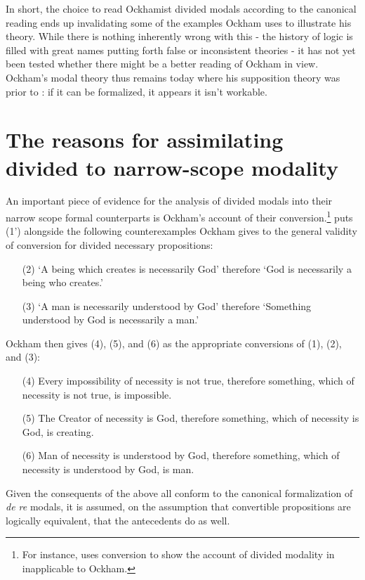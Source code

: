 \documentclass[a4paper]{article}
\begin{document}
In short, the choice to read Ockhamist divided modals according to the canonical reading ends up invalidating some of the examples Ockham uses to illustrate his theory. While there is nothing inherently wrong with this - the history of logic is filled with great names putting forth false or inconsistent theories - it has not yet been tested whether there might be a better reading of Ockham in view. Ockham's modal theory thus remains today where his supposition theory was prior to \cite{PriestRead1977}: if it can be formalized, it appears it isn't workable.

\section{The reasons for assimilating divided to narrow-scope modality}
An important piece of evidence for the analysis of divided modals into their narrow scope formal counterparts is Ockham's account of their conversion.\footnote{For instance, \cite[p. 276]{PriestRead1981} uses conversion to show the account of divided modality in \cite[sec. 12]{Moody1952} inapplicable to Ockham.} \cite[p. 242]{Johnston2015} puts (1') alongside the following counterexamples Ockham gives to the general validity of conversion for divided necessary propositions:
\begin{enumerate}
	\item[(2)]	`A being which creates is necessarily God' therefore `God is necessarily a being who creates.' 
	\item[(3)]	`A man is necessarily understood by God' therefore `Something understood by God is necessarily a man.' \cite[II. 24, p. 298]{OckhamSL2}
\end{enumerate}

Ockham then gives (4), (5), and (6) as the appropriate conversions of (1), (2), and (3):

\begin{enumerate}
\item[(4)]	Every impossibility of necessity is not true, therefore something, which of necessity is not true, is impossible.
\item[(5)]	The Creator of necessity is God, therefore something, which of necessity is God, is creating.
\item[(6)]	Man of necessity is understood by God, therefore something, which of necessity is understood by God, is man. \cite[II. 24, p. 298]{OckhamSL2}
\end{enumerate}

Given the consequents of the above all conform to the canonical formalization of \textit{de re} modals, it is assumed, on the assumption that convertible propositions are logically equivalent, that the antecedents do as well.
\end{document}
